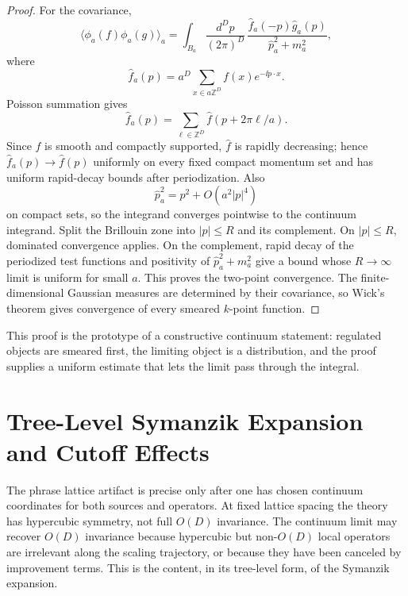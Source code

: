 \begin{proof}
For the covariance,
\[
  \langle\phi_a(f)\phi_a(g)\rangle_a
  =
  \int_{B_a}\frac{d^Dp}{(2\pi)^D}\,
  \frac{\widehat f_a(-p)\widehat g_a(p)}
       {\hat p_a^2+m_a^2},
\]
where
\[
  \widehat f_a(p)=a^D\sum_{x\in a\mathbb Z^D} f(x)e^{-\ii p\cdot x}.
\]
Poisson summation gives
\[
  \widehat f_a(p)
  =
  \sum_{\ell\in\mathbb Z^D}
  \widehat f(p+2\pi \ell/a).
\]
Since \(f\) is smooth and compactly supported, \(\widehat f\) is rapidly
decreasing; hence \(\widehat f_a(p)\to\widehat f(p)\) uniformly on every
fixed compact momentum set and has uniform rapid-decay bounds after
periodization.  Also
\[
  \hat p_a^2=p^2+O(a^2|p|^4)
\]
on compact sets, so the integrand converges pointwise to the continuum
integrand.  Split the Brillouin zone into \(|p|\le R\) and its complement.
On \(|p|\le R\), dominated convergence applies.  On the complement, rapid
decay of the periodized test functions and positivity of
\(\hat p_a^2+m_a^2\) give a bound whose \(R\to\infty\) limit is uniform for
small \(a\).  This proves the two-point convergence.  The finite-dimensional
Gaussian measures are determined by their covariance, so Wick's theorem
gives convergence of every smeared \(k\)-point function.
\end{proof}

This proof is the prototype of a constructive continuum statement:
regulated objects are smeared first, the limiting object is a distribution,
and the proof supplies a uniform estimate that lets the limit pass through
the integral.

\section{Tree-Level Symanzik Expansion and Cutoff Effects}
\label{sec:continuum-limit-symanzik-cutoff-effects}

The phrase lattice artifact is precise only after one has chosen continuum
coordinates for both sources and operators.  At fixed lattice spacing the
theory has hypercubic symmetry, not full \(O(D)\) invariance.  The continuum
limit may recover \(O(D)\) invariance because hypercubic but non-\(O(D)\)
local operators are irrelevant along the scaling trajectory, or because they
have been canceled by improvement terms.  This is the content, in its
tree-level form, of the Symanzik expansion.

